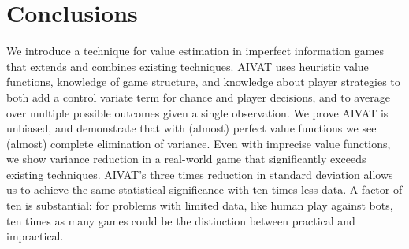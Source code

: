\documentclass[letterpaper]{article}
\def\VAT{AIVAT}
\begin{document}
\section{Conclusions}
We introduce a technique for value estimation in imperfect information
games that extends and combines existing techniques. \VAT{} uses
heuristic value functions, knowledge of game structure, and knowledge
about player strategies to both add a control variate term for chance
and player decisions, and to average over multiple possible outcomes
given a single observation. We prove \VAT{} is unbiased, and
demonstrate that with (almost) perfect value functions we see (almost)
complete elimination of variance. Even with imprecise value functions,
we show variance reduction in a real-world game that significantly
exceeds existing techniques. \VAT{}'s three times reduction in
standard deviation allows us to achieve the same statistical
significance with ten times less data. A factor of ten is substantial:
for problems with limited data, like human play against bots, ten
times as many games could be the distinction between practical and
impractical.



\end{document}

